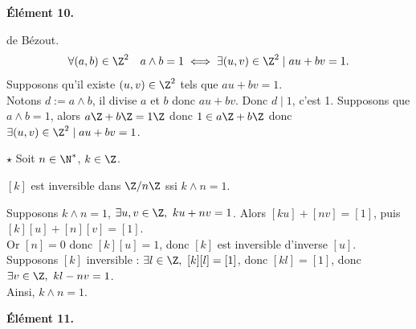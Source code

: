 \documentclass[11pt]{article}
\begin{document}
\bf{Élément 10.}

\begin{thm}{de Bézout.}{}
    \begin{equation*}
        \forall(a,b)\in\Z^2\quad a\land b = 1 \iff \exists(u,v)\in\Z^2\mid au+bv=1.
    \end{equation*}
    \tcblower
    \fbox{$\la$} Supposons qu'il existe $(u,v)\in\Z^2$ tels que $au+bv=1$.\\
    Notons $d:=a\land b$, il divise $a$ et $b$ donc $au+bv$. Donc $d\mid 1$, c'est 1.\n
    \fbox{$\ra$} Supposons que $a\land b = 1$, alors $a\Z+b\Z=1\Z$ donc $1\in a\Z+b\Z$ donc $\exists (u,v)\in\Z^2\mid au+bv=1$.
\end{thm}

\begin{thm}{$\star$}{}
    Soit $n\in\N^*$, $k\in\Z$.
    \begin{center}
        $[k]$ est inversible dans $\Z/n\Z$ ssi $k\land n = 1$.
    \end{center}
    \tcblower
    \boxed{\ra} Supposons $k\land n = 1$, $\exists u,v \in \Z, ~ ku+nv=1$. Alors $[ku]+[nv]=[1]$, puis $[k][u]+[n][v]=[1]$.\\
    Or $[n]=0$ donc $[k][u]=1$, donc $[k]$ est inversible d'inverse $[u]$.\\
    \boxed{\la} Supposons $[k]$ inversible : $\exists l \in \Z, ~ [k][l]=[1]$, donc $[kl]=[1]$, donc $\exists v \in \Z, ~ kl-nv=1$.\\
    Ainsi, $k\land n = 1$.
\end{thm}

\pagebreak

\bf{Élément 11.}
\end{document}
